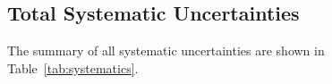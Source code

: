 \clearpage
\subsection{Total Systematic Uncertainties}
\label{sec:sys-total}

The summary of all systematic uncertainties are shown in Table~\ref{tab:systematics}.


